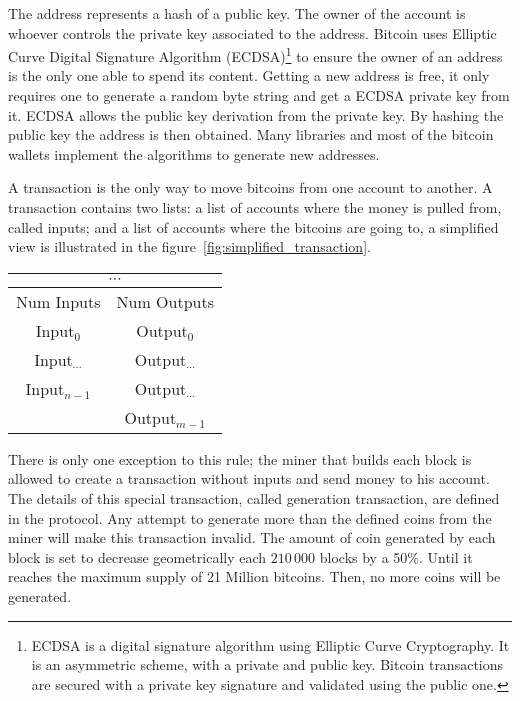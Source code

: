 The address represents a hash of a public key. The owner of the account is
  whoever controls the private key associated to the address.
Bitcoin uses Elliptic Curve Digital Signature Algorithm (ECDSA)\footnote{%
  ECDSA is a digital signature algorithm using Elliptic Curve
    Cryptography. It is an asymmetric scheme, with a private and public key.
    Bitcoin transactions are secured with a private key signature and validated
    using the public one.} to ensure the owner of an address is the only one able
  to spend its content.
Getting a new address is free, it only requires one to generate a random byte
  string and get a ECDSA private key from it. ECDSA allows the public key
  derivation from the private key.
By hashing the public key the address is then obtained.
Many libraries and most of the bitcoin wallets implement the algorithms to
  generate new addresses.

A transaction is the only way to move bitcoins from one account to another.
A transaction contains two lists:
  a list of accounts where the money is pulled from, called inputs; and a list
  of accounts where the bitcoins are going to, a simplified
  view is illustrated in the figure~\ref{fig:simplified_transaction}.

\begin{center}
    \begin{tabular}{|c|c|}
        \hline
        \multicolumn{2}{|c|}{$\cdots$} \\
        \hline
        Num Inputs & Num Outputs \\
        \hline
        Input$_0$ & Output$_0$ \\
        \hline
        Input$_{\cdots}$ & Output$_{\cdots}$ \\
        \hline
        Input$_{n - 1}$ & Output$_{\cdots}$ \\
        \hline
         & Output$_{m - 1}$ \\
        \hline
    \end{tabular}
	\label{fig:simplified_transaction}
\end{center}


There is only one exception to this rule; the miner that builds each block is
  allowed to create a transaction without inputs and send money to his account.
The details of this special transaction, called generation transaction, are
  defined in the protocol.
Any attempt to generate more than the defined coins from the miner will make
  this transaction invalid.
The amount of coin generated by each block is set to decrease geometrically
  each $210\,000$ blocks by a 50\%.
Until it reaches the maximum supply of 21 Million bitcoins.
Then, no more coins will be generated.

